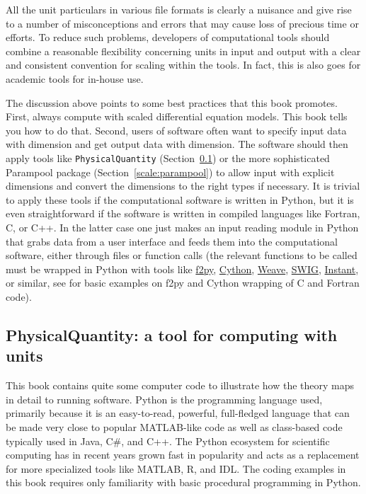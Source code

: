 \documentclass[graybox,envcountchap,sectrefs,final]{svmonodo}
\begin{document}
All the unit particulars in various file formats is clearly a nuisance
and give rise to a number of misconceptions and errors that may cause
loss of precious time or efforts. To reduce such problems, developers
of computational tools should combine a reasonable flexibility
concerning units in input and output with a clear and consistent
convention for scaling within the tools. In fact, this is also goes
for academic tools for in-house use.

The discussion above points to some best practices that this book
promotes. First, always compute with scaled differential equation
models. This book tells you how to do that. Second, users of software
often want to specify input data with dimension and get output data
with dimension. The software should then apply tools like
\texttt{PhysicalQuantity} (Section~\ref{scale:PQ})
or the more sophisticated Parampool package (Section~\ref{scale:parampool}) to allow input with explicit dimensions and
convert the dimensions to the right types if necessary.
It is trivial to apply these tools if the computational software is
written in Python, but it is even straightforward if the software is
written in compiled languages like Fortran, C, or C++. In the latter
case one just makes an input reading module in Python that grabs data from
a user interface and feeds them into the computational software, either
through files or function calls (the relevant functions to be called
must be wrapped in Python with tools like
\href{{http://docs.scipy.org/doc/numpy-dev/f2py/}}{f2py},
\href{{http://cython.org/}}{Cython},
\href{{http://docs.scipy.org/doc/scipy/reference/tutorial/weave.html}}{Weave},
\href{{http://www.swig.org/}}{SWIG},
\href{{https://bitbucket.org/fenics-project/instant}}{Instant},
or similar, see \cite[Appendix C]{Langtangen_Linge_fdm} for basic
examples on f2py and Cython wrapping of C and Fortran code).

\subsection{PhysicalQuantity: a tool for computing with units}
\label{scale:PQ}


This book contains quite some computer code to illustrate how the theory
maps in detail to running software. Python is the programming language
used, primarily because it is an easy-to-read, powerful,
full-fledged language that can be made very close to popular MATLAB-like code
as well as class-based code typically used in Java, C\#, and C++.
The Python ecosystem for scientific computing has in recent years grown
fast in popularity and acts as a replacement for more specialized tools
like MATLAB, R, and IDL.
The coding examples in this book requires only familiarity with basic
procedural programming in Python.
\end{document}
